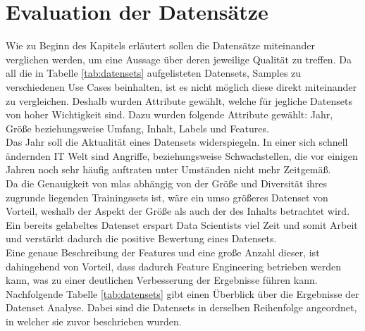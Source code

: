 \documentclass[
    12pt, %
    DIV10,
    ngerman, %
    a4paper, %
    oneside, %
    titlepage, %
    parskip=half, %
    headings=normal, %
    listof=totoc, %
    bibliography=totoc, %
    index=totoc, %
    captions=tableheading, %
    final %
]{scrreprt}
\begin{document}
\section{Evaluation der Datensätze}
Wie zu Beginn des Kapitels erläutert sollen die Datensätze miteinander verglichen werden, um eine Aussage über deren jeweilige Qualität zu treffen. Da all die in Tabelle \ref{tab:datensets} aufgelisteten Datensets, Samples zu verschiedenen Use Cases beinhalten, ist es nicht möglich diese direkt miteinander zu vergleichen. Deshalb wurden Attribute gewählt, welche für jegliche Datensets von hoher Wichtigkeit sind. Dazu wurden folgende Attribute gewählt: Jahr, Grö{\ss}e beziehungsweise Umfang, Inhalt, Labels und Features.\\
Das Jahr soll die Aktualität eines Datensets widerspiegeln. In einer sich schnell ändernden IT Welt sind Angriffe, beziehungsweise Schwachstellen, die vor einigen Jahren noch sehr häufig auftraten unter Umständen nicht mehr Zeitgemä{\ss}.\\
Da die Genauigkeit von \ac{mlas} abhängig von der Grö{\ss}e und Diversität ihres zugrunde liegenden Trainingssets ist, wäre ein umso grö{\ss}eres Datenset von Vorteil, weshalb der Aspekt der Grö{\ss}e als auch der des Inhalts betrachtet wird.\\
Ein bereits gelabeltes Datenset erspart Data Scientists viel Zeit und somit Arbeit und verstärkt dadurch die positive Bewertung eines Datensets.\\
Eine genaue Beschreibung der Features und eine gro{\ss}e Anzahl dieser, ist dahingehend von Vorteil, dass dadurch Feature Engineering betrieben werden kann, was zu einer deutlichen Verbesserung der Ergebnisse führen kann.\\
Nachfolgende Tabelle \ref{tab:datensets} gibt einen Überblick über die Ergebnisse der Datenset Analyse. Dabei sind die Datensets in derselben Reihenfolge angeordnet, in welcher sie zuvor beschrieben wurden.
\end{document}
